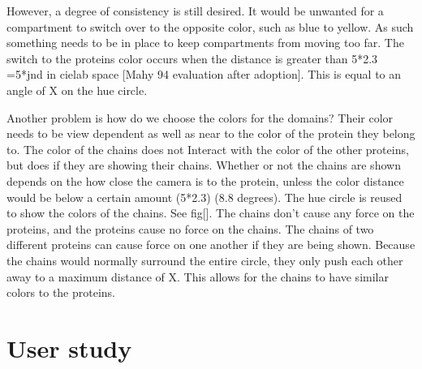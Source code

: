 \documentclass[review,journal]{vgtc}         %
\begin{document}
However, a degree of consistency is still desired. It would be unwanted for a compartment to switch over to the opposite color, such as blue to yellow.  
As such something needs to be in place to keep compartments from moving too far.
The switch to the proteins color occurs when the distance is greater than 5*2.3 =5*jnd in cielab space [Mahy 94 evaluation after adoption]. 
This is equal to an angle of X on the hue circle.

Another problem is how do we choose the colors for the domains? Their color needs to be view dependent as well as near to the color of the protein they belong to. 
The color of the chains does not Interact with the color of the other proteins, but does if they are showing their chains. 
Whether or not the chains are shown depends on the how close the camera is to the protein, unless the color distance would be below a certain amount (5*2.3) (8.8 degrees). 
The hue circle is reused to show the colors of the chains. See fig[]. 
The chains don’t cause any force on the proteins, and the proteins cause no force on the chains. 
The chains of two different proteins can cause force on one another if they are being shown. 
Because the chains would normally surround the entire circle, they only push each other away to a maximum distance of X. 
This allows for the chains to have similar colors to the proteins.

\section{User study}
\end{document}
